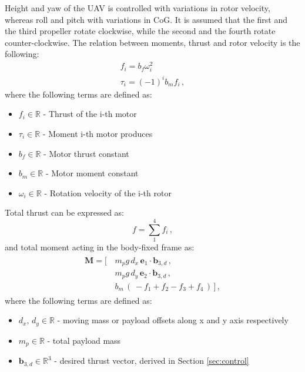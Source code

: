 \indent Height and yaw of the UAV is controlled with variations in rotor velocity, whereas roll and pitch with variations in CoG. It is assumed that the first and the third propeller rotate clockwise, while the second and the fourth rotate counter-clockwise. The relation between moments, thrust and rotor velocity is the following:
\begin{gather}
	f_i = b_f \omega_{i}^2 \label{force}\\
	\tau_i = (-1)^i b_m f_i \, ,
\end{gather}
where the following terms are defined as:
\begin{itemize}
	\item $f_i \in \mathbb{R}$ - Thrust of the i-th motor
	
	\item $\tau_i \in \mathbb{R}$ - Moment i-th motor produces
	
	\item $b_f \in \mathbb{R}$ - Motor thrust constant
	
	\item $b_m \in \mathbb{R}$ - Motor moment constant
	
	\item $\omega_i \in \mathbb{R}$ - Rotation velocity of the i-th rotor
\end{itemize}
Total thrust can be expressed as:
\begin{equation}
	f = \sum_{1}^{4}f_i \, , \label{control:f}
\end{equation}
and total moment acting in the body-fixed frame as:
\begin{align}
	\begin{split} \label{control:M}
	\textbf{M} = [\, &m_{p}g \, d_x \, \textbf{e}_1 \cdot \textbf{b}_{3,d} \,, \\
	&m_{p}g \, d_y \, \textbf{e}_2 \cdot \textbf{b}_{3,d} \,, \\
	&b_m \,(\, -f_1 + f_2 - f_3 + f_4 \,)\, ] \, ,
	\end{split}
\end{align}
where the following terms are defined as: 
\begin{itemize}
	\item $d_x,\, d_y \in \mathbb{R}$ - moving mass or payload offsets along x and y axis respectively
	\item $m_p \in \mathbb{R}$ - total payload mass 
	\item $\textbf{b}_{3,d} \in \mathbb{R}^3$ - desired thrust vector, derived in Section \ref{sec:control} 
\end{itemize}
